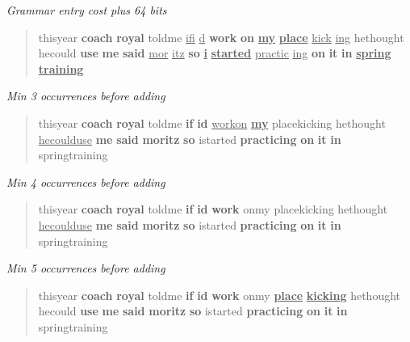 \documentclass[11pt, oneside, fleqn]{article}
\begin{document}
\textsl{Grammar entry cost plus 64 bits}
\begin{quote}thisyear \textbf{coach} \textbf{royal} toldme \underline{ifi} \underline{d} \textbf{work} \textbf{on} \textbf{\underline{my}} \textbf{\underline{place}} \underline{kick} \underline{ing} hethought hecould \textbf{use} \textbf{me} \textbf{said} \underline{mor} \underline{itz} \textbf{so} \textbf{\underline{i}} \textbf{\underline{started}} \underline{practic} \underline{ing} \textbf{on} \textbf{it} \textbf{in} \textbf{\underline{spring}} \textbf{\underline{training}}\end{quote}
	\vspace{1em}

\textsl{Min 3 occurrences before adding}
\begin{quote}thisyear \textbf{coach} \textbf{royal} toldme \textbf{if} \textbf{id} \underline{workon} \textbf{\underline{my}} placekicking hethought \underline{hecoulduse} \textbf{me} \textbf{said} \textbf{moritz} \textbf{so} istarted \textbf{practicing} \textbf{on} \textbf{it} \textbf{in} springtraining\end{quote}
	\vspace{1em}

\textsl{Min 4 occurrences before adding}
\begin{quote}thisyear \textbf{coach} \textbf{royal} toldme \textbf{if} \textbf{id} \textbf{work} onmy placekicking hethought \underline{hecoulduse} \textbf{me} \textbf{said} \textbf{moritz} \textbf{so} istarted \textbf{practicing} \textbf{on} \textbf{it} \textbf{in} springtraining\end{quote}
	\vspace{1em}

\textsl{Min 5 occurrences before adding}
\begin{quote}thisyear \textbf{coach} \textbf{royal} toldme \textbf{if} \textbf{id} \textbf{work} onmy \textbf{\underline{place}} \textbf{\underline{kicking}} hethought hecould \textbf{use} \textbf{me} \textbf{said} \textbf{moritz} \textbf{so} istarted \textbf{practicing} \textbf{on} \textbf{it} \textbf{in} springtraining\end{quote}
	\vspace{1em}
\end{document}
